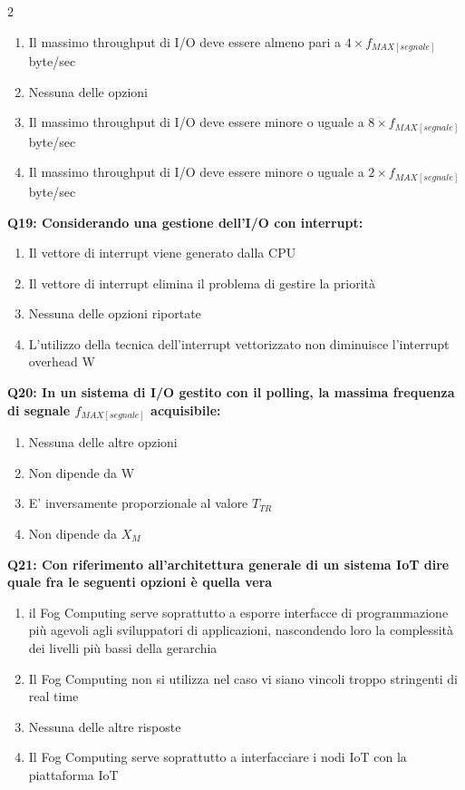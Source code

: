 \documentclass[10pt]{article}
\begin{document}
\begin{multicols}{2}
\begin{enumerate}[label=\arabic*.]
\item Il massimo throughput di I/O deve essere almeno pari a $4 \times f_{MAX[segnale]}$ byte/sec
\item Nessuna delle opzioni
\item Il massimo throughput di I/O deve essere minore o uguale a $8 \times f_{MAX[segnale]}$ byte/sec
\item Il massimo throughput di I/O deve essere minore o uguale a $2 \times f_{MAX[segnale]}$ byte/sec
\end{enumerate}
\textbf{Q19: Considerando una gestione dell’I/O con interrupt:}

\begin{enumerate}[label=\arabic*.]
\item Il vettore di interrupt viene generato dalla CPU
\item Il vettore di interrupt elimina il problema di gestire la priorità
\item Nessuna delle opzioni riportate
\item L’utilizzo della tecnica dell’interrupt vettorizzato non diminuisce l’interrupt overhead W
\end{enumerate}
\textbf{Q20: In un sistema di I/O gestito con il polling, la massima frequenza di segnale $f_{MAX[segnale]}$ acquisibile:}

\begin{enumerate}[label=\arabic*.]
\item Nessuna delle altre opzioni
\item Non dipende da W
\item E' inversamente proporzionale al valore $T_{TR}$
\item Non dipende da $X_M$
\end{enumerate}
\textbf{Q21: Con riferimento all’architettura generale di un sistema IoT dire quale fra le seguenti opzioni è quella vera}

\begin{enumerate}[label=\arabic*.]
\item il Fog Computing serve soprattutto a esporre interfacce di programmazione più agevoli agli sviluppatori di applicazioni, nascondendo loro la complessità dei livelli più bassi della gerarchia
\item Il Fog Computing non si utilizza nel caso vi siano vincoli troppo stringenti di real time
\item Nessuna delle altre risposte
\item Il Fog Computing serve soprattutto a interfacciare i nodi IoT con la piattaforma IoT
\end{enumerate}
\end{multicols}
\end{document}
